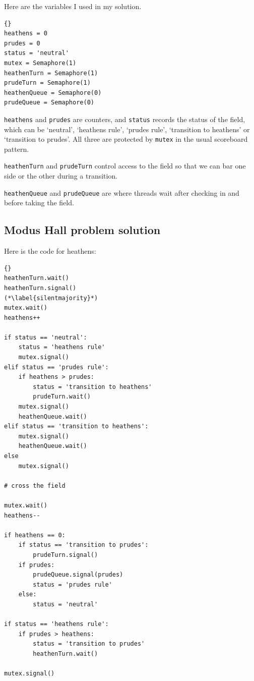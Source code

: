\documentclass{book}
\newcommand{\clearemptydoublepage}{\newpage\cleardoublepage}
\begin{document}
Here are the variables I used in my solution.

\begin{lstlisting}[title={Modus problem hint}]{}
heathens = 0
prudes = 0
status = 'neutral'
mutex = Semaphore(1)
heathenTurn = Semaphore(1)
prudeTurn = Semaphore(1)
heathenQueue = Semaphore(0)
prudeQueue = Semaphore(0)
\end{lstlisting}

{\tt heathens} and {\tt prudes} are counters, and {\tt status} records
the status of the field, which can be `neutral', `heathens rule',
`prudes rule', `transition to heathens' or `transition to prudes'.
All three are protected by {\tt mutex} in the usual scoreboard
pattern.

{\tt heathenTurn} and {\tt prudeTurn} control access to the field
so that we can bar one side or the other during a transition.

{\tt heathenQueue} and {\tt prudeQueue} are where threads wait after
checking in and before taking the field.


\clearemptydoublepage
\subsection {Modus Hall problem solution}

Here is the code for heathens:

\begin{lstlisting}[title={Modus problem solution}]{}
heathenTurn.wait()
heathenTurn.signal()
(*\label{silentmajority}*)
mutex.wait()
heathens++

if status == 'neutral':
    status = 'heathens rule'
    mutex.signal()
elif status == 'prudes rule':
    if heathens > prudes:
        status = 'transition to heathens'
        prudeTurn.wait()
    mutex.signal()
    heathenQueue.wait()
elif status == 'transition to heathens':
    mutex.signal()
    heathenQueue.wait()
else
    mutex.signal()

# cross the field

mutex.wait()
heathens--

if heathens == 0:
    if status == 'transition to prudes':
        prudeTurn.signal()
    if prudes:
        prudeQueue.signal(prudes)
        status = 'prudes rule'
    else:
        status = 'neutral'
        
if status == 'heathens rule':
    if prudes > heathens:
        status = 'transition to prudes'
        heathenTurn.wait()

mutex.signal()
\end{lstlisting}
\end{document}
